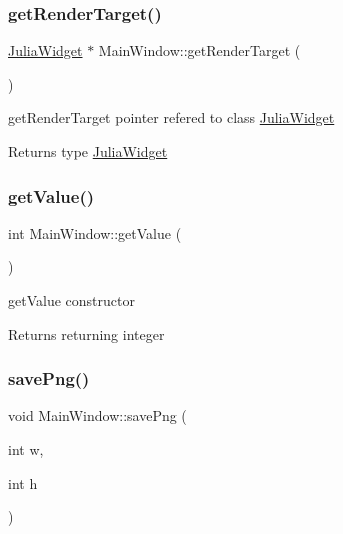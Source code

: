 \subsubsection{\texorpdfstring{get\+Render\+Target()}{getRenderTarget()}}
{\footnotesize\ttfamily \hyperlink{classJuliaWidget}{Julia\+Widget} $\ast$ Main\+Window\+::get\+Render\+Target (\begin{DoxyParamCaption}{ }\end{DoxyParamCaption})}



get\+Render\+Target pointer refered to class \hyperlink{classJuliaWidget}{Julia\+Widget} 

\begin{DoxyReturn}{Returns}
type \hyperlink{classJuliaWidget}{Julia\+Widget} 
\end{DoxyReturn}
\mbox{\label{classMainWindow_a60d21468b55f475cc6187e577f3237de}} 
\subsubsection{\texorpdfstring{get\+Value()}{getValue()}}
{\footnotesize\ttfamily int Main\+Window\+::get\+Value (\begin{DoxyParamCaption}{ }\end{DoxyParamCaption})}



get\+Value constructor 

\begin{DoxyReturn}{Returns}
returning integer 
\end{DoxyReturn}
\mbox{\label{classMainWindow_a2bb633e0547f37d75ba5ec77417b574f}} 
\subsubsection{\texorpdfstring{save\+Png()}{savePng()}}
{\footnotesize\ttfamily void Main\+Window\+::save\+Png (\begin{DoxyParamCaption}\item[{int}]{w,  }\item[{int}]{h }\end{DoxyParamCaption})\hspace{0.3cm}{\ttfamily [protected]}}



